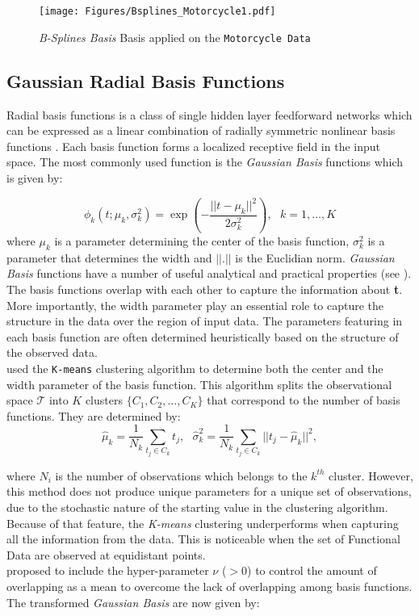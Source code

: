 \begin{figure}[h]
  \centering
    \texttt{[image: Figures/Bsplines\_Motorcycle1.pdf]}
  \caption[\textit{B-Splines Basis} Basis applied on the \texttt{Motorcycle Data}]{\textit{B-Splines Basis} Basis applied on the \texttt{Motorcycle Data}}
  \label{fig:FDA42}
\end{figure}

\subsection{Gaussian Radial Basis Functions}

Radial basis functions is a class of single hidden layer feedforward networks which can be expressed as a linear combination of radially symmetric nonlinear basis functions \citep{Ando2008}. Each basis function forms a localized receptive field in the input space. The most commonly used function is the \textit{Gaussian Basis} functions which is given by:

\begin{equation}
\phi_k(t;\mu_k ,\sigma^2_k) = \exp \left(-\dfrac{||t-\mu_k||^2}{2\sigma^2_k}\right),\textbf{ } k=1,\dots,K
\end{equation}
where $\mu_k $ is a parameter determining the center of the basis function, $\sigma^2_k $ is a parameter that determines the width and $||.||$ is the Euclidian norm. \textit{Gaussian Basis} functions have a number of useful analytical and practical properties (see \cite{Bishop1995}). The basis functions overlap with each other to capture the information about \textbf{t}. More importantly, the width parameter play an essential role to capture the structure in the data over the region of input data. The parameters featuring in each basis function are often determined heuristically based on the structure of the observed data.\\
\cite{Moody1989} used the \texttt{K-means} clustering algorithm to determine both the center and the width parameter of the basis function. This algorithm splits the observational space $\mathcal{T}$ into $K$ clusters $\{C_1,C_2,\dots,C_K\}$ that correspond to the number of basis functions. They are determined by:
\begin{equation}
\hat{\mu}_k = \frac{1}{N_k}\sum_{t_j \in C_k} t_j, \text{  } \hat{\sigma}^2_k = \dfrac{1}{N_k}\sum_{t_j \in C_k} ||t_j - \hat{\mu}_k||^2,
\end{equation}

where $N_i $ is the number of observations which belongs to the $k^{th}$ cluster. However, this method does not produce unique parameters for a unique set of observations, due to the stochastic nature of the starting value in the clustering algorithm. Because of that feature, the \textit{K-means} clustering underperforms when capturing all the information from the data. This is noticeable when the set of Functional Data are observed at equidistant points.\\ \cite{Ando2008} proposed to include the hyper-parameter $\nu$ ($> 0$) to control the amount of overlapping as a mean to overcome the lack of overlapping among basis functions. The transformed \textit{Gaussian Basis} are now given by:

